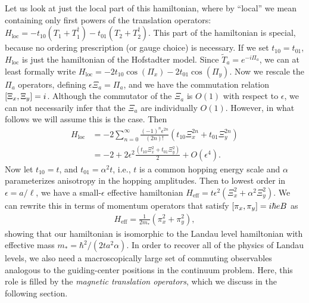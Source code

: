 \documentclass[aps,prb,twocolumn,letterpaper,twoside,nobalancelastpage,groupedaddress,amsmath,amssymb,floatfix,citeautoscript]{revtex4-1}
\begin{document}
Let us look at just the local part of this hamiltonian, where by ``local'' we mean containing only first powers of the translation operators: $H_{\text{loc}} = -t_{10}\left(T_1 + T_1^{\dag}\right) - t_{01}\left(T_2 + T_2^{\dag}\right)$. This part of the hamiltonian is special, because no ordering prescription (or gauge choice) is necessary.   If we set $t_{10} = t_{01}$, $H_{\text{loc}}$ is just the hamiltonian of the Hofstadter model. Since $\widetilde{T}_a = e^{-i\Pi_a}$, we can at least formally write $H_{\text{loc}}= -2t_{10}\cos\left(\Pi_x\right) - 2 t_{01}\cos\left(\Pi_y\right).$ Now we rescale the $\Pi_a$ operators, defining $\epsilon\Xi_a = \Pi_a$, and we have the commutation relation $\comm{\Xi_x}{\Xi_y} = i$. Although the commutator of the $\Xi_a$ is $O(1)$ with respect to $\epsilon$, we can not necessarily infer that the $\Xi_a$ are individually $O(1)$. However, in what follows we will assume this is the case. Then
\begin{align*}
H_{\text{loc}} &= -2\sum_{n=0}^{\infty}  \frac{(-1)^{n}\epsilon^{2n}}{(2n)!} \left(t_{10}\Xi^{2n}_x + t_{01} \Xi^{2n}_y\right)\\
&= -2 + 2\epsilon^2\frac{\left(t_{10}\Xi^{2}_x + t_{01}\Xi^{2}_y\right)}{2} +O(\epsilon^4).
\end{align*}
Now let $t_{10} = t$, and $t_{01} = \alpha^2 t$, i.e., $t$ is a common hopping energy scale and $\alpha$ parameterizes anisotropy in the hopping amplitudes. Then to lowest order in $\epsilon = a/\ell$, we have a small-$\epsilon$ effective hamiltonian $H_{\text{eff}}= t\epsilon^2 \left(\Xi^{2}_x + \alpha^2\Xi^{2}_y\right)$. We can rewrite this in terms of momentum operators that satisfy $\comm{\pi_x}{\pi_y} = i\hbar e B$ as
\begin{align*}
H_{\text{eff}} = \frac{1}{2m_{\ast}}\left(\pi_x^2 + \pi_y^2\right),
\end{align*}
showing that our hamiltonian is isomorphic to the Landau level hamiltonian with effective mass $m_{\ast} = \hbar^2/(2ta^2\alpha)$. In order to recover all of the physics of Landau levels, we also need a macroscopically large set of commuting observables analogous to the guiding-center positions in the continuum problem.
Here, this role is filled by the \textit{magnetic translation operators}, which we discuss in the following section.
\end{document}
